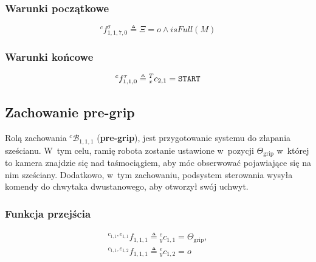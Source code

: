 \subsubsection{Warunki początkowe}
\begin{equation}
    {}^{c}f^{\sigma}_{1,1,7,0} \triangleq \Xi = o \land isFull(M)
\end{equation}

\subsubsection{Warunki końcowe}
\begin{equation}
    {}^{c}f^{\tau}_{1,1,0} \triangleq {}^{T}_{x}c_{2,1} = \text{\texttt{START}}
\end{equation}


\subsection{Zachowanie pre-grip}
\label{subsec:cs-pre-grip}

Rolą zachowania ${}^{c}\mathcal{B}_{1,1,1}$ (\textbf{pre-grip}), jest przygotowanie systemu do złapania sześcianu. W~tym celu, ramię robota zostanie ustawione w~pozycji $\Theta_{\mathrm{grip}}$ w~której to kamera znajdzie się nad taśmociągiem, aby móc obserwować pojawiające się na nim sześciany. Dodatkowo, w~tym zachowaniu, podsystem sterowania wysyła komendy do chwytaka dwustanowego, aby otworzył swój uchwyt.

\subsubsection{Funkcja przejścia}
\begin{equation}
    \begin{gathered}
        {}^{c_{1,1}, e_{1,1}}f_{1,1,1} \triangleq {}^{e}_{y}c_{1,1} = \Theta_{\mathrm{grip}},
        \\
        {}^{c_{1,1}, e_{1,2}}f_{1,1,1} \triangleq {}^{e}_{y}c_{1,2} = o
    \end{gathered}
\end{equation}
    
